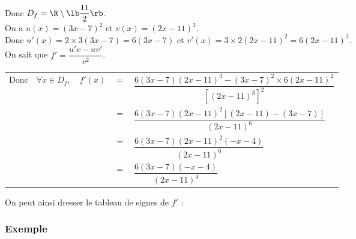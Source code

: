 Donc $D_f = \R \setminus \lb \dfrac{11}{2} \rb$. \\

On a $u(x) = \left(3x - 7\right)^2$ et $v(x) = \left(2x -11\right)^3$. \\
Donc $u'(x) = 2 \times 3\left(3x - 7\right) = 6\left(3x-7\right)$ et $v'(x) = 3 \times 2\left(2x - 11\right)^2 = 6\left(2x - 11\right)^2$. \\

On sait que $f' = \dfrac{u'v - uv'}{v^2}$.

\begin{tabular}{lllll}
Donc & $\forall x \in D_f,$ & $ f'(x)$ & $ = $ & $ \dfrac{6\left(3x-7\right)\left(2x-11\right)^3 - \left(3x - 7\right)^2 \times 6 \left(2x-11\right)^2}{\left[\left(2x-11\right)^3\right]^2}$ \vspace*{.3cm} \\
& & & $=$ & $\dfrac{6\left(3x-7\right)\left(2x-11\right)^2\left[\left(2x - 11\right)-\left(3x - 7\right)\right]}{\left(2x-11\right)^6}$ \vspace*{.3cm} \\
& & & $=$ & $\dfrac{6\left(3x-7\right)\left(2x-11\right)^2\left(-x-4\right)}{\left(2x -11\right)^6}$ \vspace*{.3cm} \\
& & & $=$ & $\dfrac{6\left(3x-7\right)\left(-x-4\right)}{\left(2x -11\right)^4}$ \vspace*{.3cm} \\
\end{tabular}

\vspace*{.3cm}

On peut ainsi dresser le tableau de signes de $f'$ : \\


\vspace*{.3cm}

\newpage

\subsubsection{Exemple }

